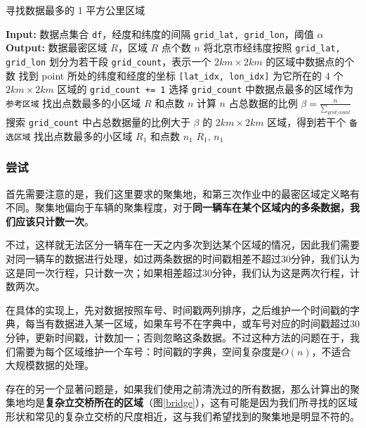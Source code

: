 \documentclass[UTF8]{ctexart}
\begin{document}
\begin{algorithm}[htb]
    \caption{寻找数据最多的 1 平方公里区域}
    \label{alg-1}
    \begin{algorithmic}[1]
    \STATE \textbf{Input:} 数据点集合 \texttt{df}，经度和纬度的间隔 \texttt{grid\_lat, grid\_lon}，阈值 $\alpha$
    \STATE \textbf{Output:} 数据最密区域 $R$，区域 $R$ 点个数 $n$
    \STATE 将北京市经纬度按照 \texttt{grid\_lat, grid\_lon} 划分为若干段
    \STATE \texttt{grid\_count}，表示一个 $2km \times 2km$ 的区域中数据点的个数
        \STATE 找到 point 所处的纬度和经度的坐标 \texttt{[lat\_idx, lon\_idx]}
        \STATE 为它所在的 $4$ 个 $2km \times 2km$ 区域的 \texttt{grid\_count += 1} 
    \ENDFOR
    \STATE 选择 \texttt{grid\_count} 中数据点最多的区域作为\texttt{参考区域}
        \STATE 找出点数最多的小区域 $R$ 和点数 $n$
    \ENDFOR
    \STATE 计算 $n$ 占总数据的比例 $\beta = \frac{n}{\sum_{grid\_count}}$
    \STATE 搜索 \texttt{grid\_count} 中占总数据量的比例大于 $\beta$ 的 $2km \times 2km$ 区域，得到若干个 \texttt{备选区域}
            \STATE 找出点数最多的小区域 $R_1$ 和点数 $n_1$
        \ENDFOR
    \ENDFOR
    \RETURN $R_1$, $n_1$
    \end{algorithmic}
\end{algorithm}

\subsubsection{尝试}\label{try}

首先需要注意的是，我们这里要求的聚集地，和第三次作业中的最密区域定义略有不同。聚集地偏向于车辆的聚集程度，对于\textbf{同一辆车在某个区域内的多条数据，我们应该只计数一次}。

不过，这样就无法区分一辆车在一天之内多次到达某个区域的情况，因此我们需要对同一辆车的数据进行处理，如过两条数据的时间戳相差不超过$30$分钟，我们认为这是同一次行程，只计数一次；如果相差超过$30$分钟，我们认为这是两次行程，计数两次。

在具体的实现上，先对数据按照车号、时间戳两列排序，之后维护一个时间戳的字典，每当有数据进入某一区域，如果车号不在字典中，或车号对应的时间戳超过$30$分钟，更新时间戳，计数加一；否则忽略这条数据。不过这种方法的问题在于，我们需要为每个区域维护一个车号：时间戳的字典，空间复杂度是$O(n)$，不适合大规模数据的处理。

存在的另一个显著问题是，如果我们使用之前清洗过的所有数据，那么计算出的聚集地均是\textbf{复杂立交桥所在的区域}（图\ref{bridge}），这有可能是因为我们所寻找的区域形状和常见的复杂立交桥的尺度相近，这与我们希望找到的聚集地是明显不符的。
\end{document}
